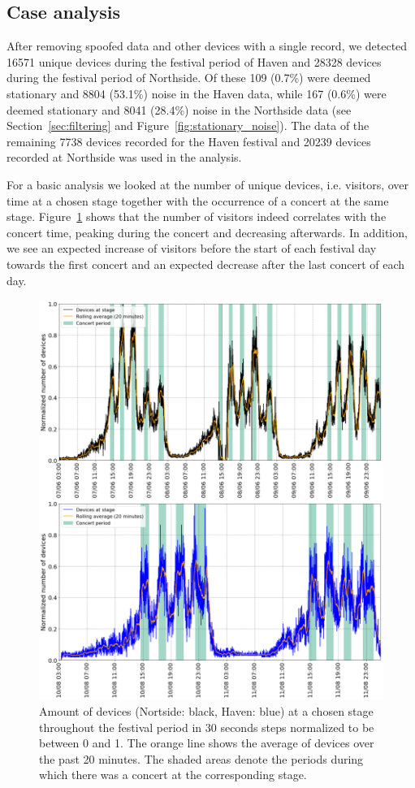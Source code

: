 \subsection{Case analysis}
After removing spoofed data and other devices with a single record, we detected 16571 unique devices during the festival period of Haven and 28328 devices during the festival period of Northside. Of these 109 (0.7\%) were deemed stationary and 8804 (53.1\%) noise in the Haven data, while 167 (0.6\%) were deemed stationary and 8041 (28.4\%) noise in the Northside data (see Section~\ref{sec:filtering} and Figure~\ref{fig:stationary_noise}). The data of the remaining 7738 devices recorded for the Haven festival and 20239 devices recorded at Northside was used in the analysis.  

For a basic analysis we looked at the number of unique devices, i.e. visitors, over time at a chosen stage together with the occurrence of a concert at the same stage. Figure~\ref{fig:stage_timelines} shows that the number of visitors indeed correlates with the concert time, peaking during the concert and decreasing afterwards. In addition, we see an expected increase of visitors before the start of each festival day towards the first concert and an expected decrease after the last concert of each day.

\begin{figure}[tb]
  \centering
  \includegraphics[width=\linewidth]{figs/stage_timelines.png}
  \caption{Amount of devices (Nortside: black, Haven: blue) at a chosen stage throughout the festival period in 30 seconds steps normalized to be between 0 and 1. The orange line shows the average of devices over the past 20 minutes. The shaded areas denote the periods during which there was a concert at the corresponding stage.}
  \label{fig:stage_timelines}
\end{figure}


